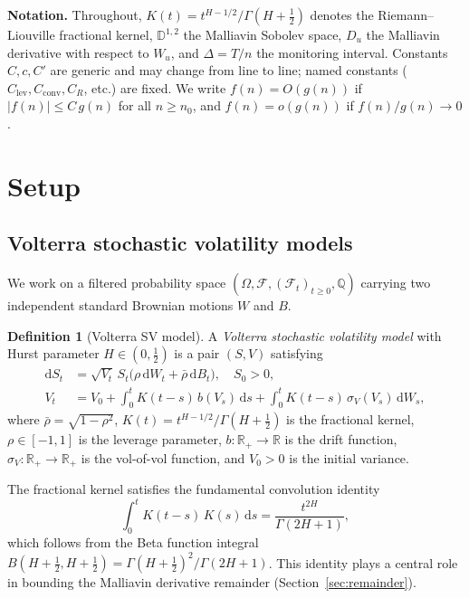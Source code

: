 \documentclass[12pt]{article}
\theoremstyle{definition}
\newtheorem{definition}[theorem]{Definition}
\newcommand{\R}{\mathbb{R}}
\newcommand{\dd}{\mathrm{d}}
\newcommand{\Dbb}{\mathbb{D}}
\begin{document}
\medskip

\noindent\textbf{Notation.}
Throughout, $K(t) = t^{H-1/2}/\Gamma(H+\tfrac12)$ denotes the
Riemann--Liouville fractional kernel, $\Dbb^{1,2}$ the Malliavin
Sobolev space, $D_u$ the Malliavin derivative with respect to $W_u$,
and $\Delta = T/n$ the monitoring interval.
Constants $C, c, C'$ are generic and may change from line to line;
named constants ($C_{\mathrm{lev}}, C_{\mathrm{conv}}, C_R$, etc.)
are fixed.
We write $f(n) = O(g(n))$ if $|f(n)| \le C\,g(n)$ for all
$n \ge n_0$, and $f(n) = o(g(n))$ if $f(n)/g(n) \to 0$.

\section{Setup}\label{sec:setup}

\subsection{Volterra stochastic volatility models}
\label{sec:volterra-sv}

We work on a filtered probability space
$(\Omega, \mathcal F, (\mathcal F_t)_{t \ge 0}, \mathbb Q)$
carrying two independent standard Brownian motions $W$ and $B$.

\begin{definition}[Volterra SV model]\label{def:volterra-sv}
A \emph{Volterra stochastic volatility model} with Hurst parameter
$H \in (0,\tfrac12)$ is a pair $(S,V)$ satisfying
\begin{align}
  \dd S_t &= \sqrt{V_t}\, S_t
    \bigl(\rho\,\dd W_t + \bar\rho\,\dd B_t\bigr),
    \quad S_0 > 0,
    \label{eq:S-dynamics}\\[4pt]
  V_t &= V_0
    + \int_0^t K(t{-}s)\, b(V_s)\,\dd s
    + \int_0^t K(t{-}s)\, \sigma_V(V_s)\,\dd W_s,
    \label{eq:V-dynamics}
\end{align}
where $\bar\rho = \sqrt{1-\rho^2}$,\;
$K(t) = t^{H-1/2}/\Gamma(H+\tfrac12)$ is the fractional kernel,\;
$\rho \in [-1,1]$ is the leverage parameter,\;
$b\colon\R_+\to\R$ is the drift function,\;
$\sigma_V\colon\R_+\to\R_+$ is the vol-of-vol function,\;
and $V_0 > 0$ is the initial variance.
\end{definition}

The fractional kernel satisfies the fundamental convolution identity
\begin{equation}\label{eq:beta-convolution}
  \int_0^t K(t{-}s)\,K(s)\,\dd s
  = \frac{t^{2H}}{\Gamma(2H{+}1)},
\end{equation}
which follows from the Beta function integral
$B(H{+}\tfrac12, H{+}\tfrac12) =
\Gamma(H{+}\tfrac12)^2/\Gamma(2H{+}1)$.
This identity plays a central role in bounding the Malliavin
derivative remainder (Section~\ref{sec:remainder}).
\end{document}
